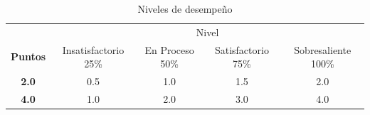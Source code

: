 \documentclass{article}
\begin{document}
\begin{itemize}
\begin{itemize}
		\begin{table}[ht]
			\caption{Niveles de desempeño}
			\begin{center}
			\begin{tabular}{ccccc}
    			\hline
    			 & \multicolumn{4}{c}{Nivel}\\
    			\cline{1-5}
    			\textbf{Puntos} & Insatisfactorio 25\%& En Proceso 50\% & Satisfactorio 75\% & Sobresaliente 100\%\\
    			\textbf{2.0}&0.5&1.0&1.5&2.0\\
    			\textbf{4.0}&1.0&2.0&3.0&4.0\\
    		\hline
			\end{tabular}
		\end{center}
	\end{table}	
	
	\end{itemize}
	

\end{itemize}
\end{document}
